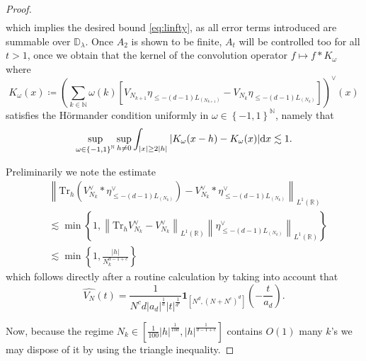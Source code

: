 \documentclass[12pt,leqno]{amsart}
\def\d{{\rm d}}
\def\R {\mathbb{R}}
\def\N {\mathbb{N}}
\def\Tr {{\mathrm{Tr}}}
\newcommand{\cic}{\bm}
\numberwithin{equation}{section}
\numberwithin{counter2}{section}
\theoremstyle{definition}
\theoremstyle{plain}
\begin{document}
\begin{proof}
\[\begin{split}
		\end{split} \] which implies the desired bound \eqref{eq:linfty}, as all error terms introduced are summable over $\mathbb{D}_{\lambda}.$ Once $A_2$ is shown to be finite,   $A_{t}$ will be controlled too for all $t>1$, once we obtain that the kernel of the convolution operator $f \mapsto  f*K_{\omega}$ where \[  K_{\omega}(x) \coloneqq \left( \sum_{k \in \N} \omega(k) \left[V_{N_{k+1}}\eta_{\leq -(d-1)L_{(N_{k+1})}} - V_{N_k}\eta_{\leq -(d-1)L_{(N_k)}} \right] \right)^{\vee}(x)  \] satisfies the H\"{o}rmander condition uniformly in $\omega \in \left\{-1,1\right\}^{\N}$, namely that \[  \sup_{\omega \in  \left\{-1,1\right\}^{\N}} \sup_{h \neq 0} \int_{|x| \geq 2|h|}|K_{\omega}(x-h)-K_{\omega}(x)| \d x  \lesssim 1.   \]
		
		Preliminarily we note the estimate \[ \begin{split}
			&\left \| \Tr_h\left( V_{N_k}^{\vee} * \eta_{\le -(d-1) L_{(N_k)}}^{\vee} \right)- V_{N_k}^{\vee} * \eta_{\le -(d-1) L_{(N_k)}}^{\vee}\right \|_{L^1(\R)}\\
            &  \lesssim  \min\left\{1, \left \| \Tr_hV_{N_k}^{\vee}-V_{N_k}^{\vee}  \right \|_{L^1(\R)} \left \|  \eta_{\le -(d-1) L_{(N_k)}}^{\vee}  \right \|_{L^1(\R)}\right\} \\ & \lesssim  \min \left\{1,\frac{|h|}{N_k^{d-1+c}}\right\}
		\end{split} \] 
		which follows directly after a routine calculation by taking into account that 
		\[ \widehat{V_N}(t)=  \frac{1}{N^cd \left |a_d\right |^{\frac{1}{d}} \left|t\right|^{\frac{1}{d'}}} \cic{1}_{[N^d,(N+N^c)^d]}\left (-\frac{t}{a_d}\right ). \] 
		
		Now, because the regime
		$ N_k \in \left[\frac{1}{100} |h|^{\frac{1}{10d}},  |h|^{\frac{1}{d-1+c}}\right] $ contains $O(1)$ many $k$'s we may dispose of it by using the triangle inequality. 
		

\end{proof}
\end{document}
